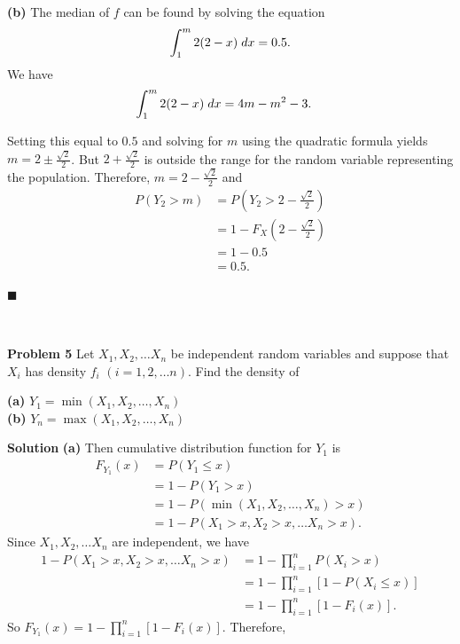 \documentclass{article}
\newcommand{\mybox}{%
    \collectbox{%
        \setlength{\fboxsep}{1pt}%
        \fbox{\BOXCONTENT}%
    }%
}
\begin{document}
\vspace{3mm}

\noindent\textbf{(b)}  The median of $f$ can be found by solving the equation $$\int_1^m 2(2-x) \hspace{1mm} dx = 0.5.$$  We have
\begin{align}
\int_1^m 2(2-x) \hspace{1mm} dx &= 4m-m^2 -3.
\end{align}

\noindent Setting this equal to $0.5$ and solving for $m$ using the quadratic formula yields $m = 2 \pm \frac{\sqrt{2}}{2}$.  But $2+\frac{\sqrt{2}}{2}$ is outside the range for the random variable representing the population.  Therefore, $m=2-\frac{\sqrt{2}}{2}$ and 
\begin{align}
P(Y_2 > m) &= P\left(Y_2 > 2 - \frac{\sqrt{2}}{2}\right) \\
&= 1 - F_X\left(2-\frac{\sqrt{2}}{2}\right) \\
&= 1 - 0.5 \\
&= 0.5.
\end{align}

\vspace{-2mm}
\hfill$\blacksquare$

\begin{center}
\vspace{-0.4cm}
\hrulefill \\
\vspace{-0.7cm}
\hrulefill
\end{center}

\vspace{10mm}

\noindent\mybox{\textbf{Problem 5}}  Let $X_1, X_2, \ldots X_n$ be independent random variables and suppose that $X_i$ has density $f_i$ $(i = 1, 2, \ldots n)$.  Find the density of
\begin{flushleft}
\textbf{(a)}  $Y_1 = \min(X_1, X_2, \ldots, X_n)$ \\
\textbf{(b)}  $Y_n = \max(X_1, X_2, \ldots, X_n)$
\end{flushleft}

\vspace{5mm}

\noindent\mybox{\textbf{Solution}}  \textbf{(a)}  Then cumulative distribution function for $Y_1$ is
\begin{align}
F_{Y_1}(x) &= P(Y_1 \leq x) \\
&= 1 - P(Y_1 > x) \\
&= 1 - P(\min(X_1,X_2,\ldots,X_n) > x) \\
&= 1 - P(X_1 > x, X_2 > x, \ldots X_n > x).
\end{align}
\noindent Since $X_1, X_2,\ldots X_n$ are independent, we have
\begin{align}
1 - P(X_1 > x, X_2 > x, \ldots X_n > x) &= 1 - \prod\limits_{i=1}^nP(X_i > x) \\
&= 1 - \prod\limits_{i=1}^n[1- P(X_i \leq x)] \\
&= 1 - \prod\limits_{i=1}^n[1-F_i(x)].
\end{align}
\noindent So $F_{Y_1}(x) = 1 - \prod\limits_{i=1}^n[1-F_i(x)]$.  Therefore, 
\end{document}
